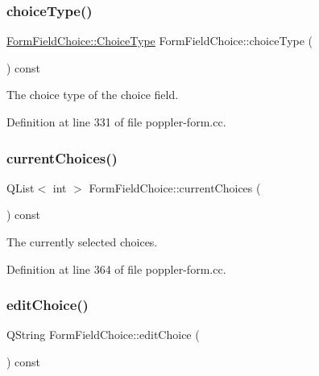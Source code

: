 \mbox{\label{class_poppler_1_1_form_field_choice_a60a88c8cd4893afaa966be8f8da54a4f}} 
\subsubsection{\texorpdfstring{choice\+Type()}{choiceType()}}
{\footnotesize\ttfamily \hyperlink{class_poppler_1_1_form_field_choice_a28f7cab7585f5630e26d1b5ed832c050}{Form\+Field\+Choice\+::\+Choice\+Type} Form\+Field\+Choice\+::choice\+Type (\begin{DoxyParamCaption}{ }\end{DoxyParamCaption}) const}

The choice type of the choice field. 

Definition at line 331 of file poppler-\/form.\+cc.

\mbox{\label{class_poppler_1_1_form_field_choice_a3b319f26b1f3c26829386a67c57818ee}} 
\subsubsection{\texorpdfstring{current\+Choices()}{currentChoices()}}
{\footnotesize\ttfamily Q\+List$<$ int $>$ Form\+Field\+Choice\+::current\+Choices (\begin{DoxyParamCaption}{ }\end{DoxyParamCaption}) const}

The currently selected choices. 

Definition at line 364 of file poppler-\/form.\+cc.

\mbox{\label{class_poppler_1_1_form_field_choice_a6c5a39cc1e4c74914396ad0183b40be3}} 
\subsubsection{\texorpdfstring{edit\+Choice()}{editChoice()}}
{\footnotesize\ttfamily Q\+String Form\+Field\+Choice\+::edit\+Choice (\begin{DoxyParamCaption}{ }\end{DoxyParamCaption}) const}

